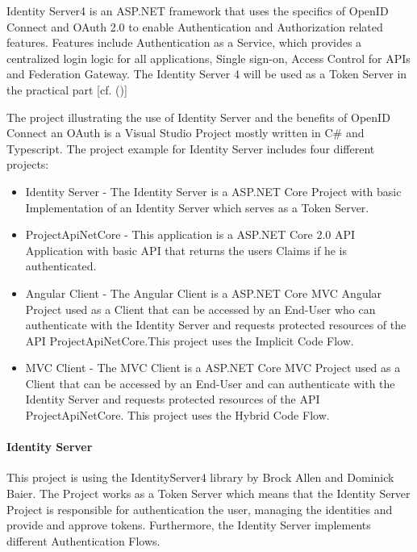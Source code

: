 Identity Server4 is an ASP.NET framework that uses the specifics of OpenID Connect and OAuth 2.0 to enable Authentication and Authorization related features. Features include Authentication as a Service, which provides a centralized login logic for all applications, Single sign-on, Access Control for APIs and Federation Gateway. The Identity Server 4 will be used as a Token Server in the practical part [cf. (\cite{Brock:2018:ID4})]

The project illustrating the use of Identity Server and the benefits of OpenID Connect an OAuth is a Visual Studio Project mostly written in C\# and Typescript. The project example for Identity Server includes four different projects:

\begin{itemize}
	\item Identity Server - The Identity Server is a ASP.NET Core Project with basic Implementation of an Identity Server which serves as a Token Server. 
	\item ProjectApiNetCore - This application is a ASP.NET Core 2.0 API Application with basic API that returns the users Claims if he is authenticated.
	\item Angular Client - The Angular Client is a ASP.NET Core MVC Angular Project used as a Client that can be accessed by an End-User who can authenticate with the Identity Server and requests protected resources of the API ProjectApiNetCore.This project uses the Implicit Code Flow. 
	\item MVC Client - The MVC Client is a ASP.NET Core MVC Project used as a Client that can be accessed by an End-User and can authenticate with the Identity Server and requests protected resources of the API ProjectApiNetCore. This project uses the Hybrid Code Flow. 
\end{itemize}



\paragraph{Identity Server}

This project is using the IdentityServer4 library by Brock Allen and Dominick Baier. The Project works as a Token Server which means that the Identity Server Project is responsible for authentication the user, managing the identities and provide and approve tokens. Furthermore, the Identity Server implements different Authentication Flows.


